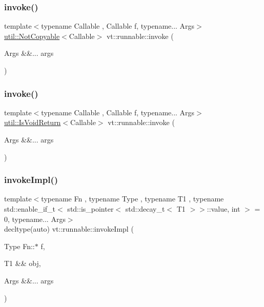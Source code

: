 \mbox{\label{namespacevt_1_1runnable_aa86b7892ea9590c2e8fef9ed0ca4e80c}} 
\subsubsection{\texorpdfstring{invoke()}{invoke()}\hspace{0.1cm}{\footnotesize\ttfamily [2/3]}}
{\footnotesize\ttfamily template$<$typename Callable , Callable f, typename... Args$>$ \\
\hyperlink{namespacevt_1_1util_a0760a3963341a602dfe2dfc42d78c867}{util\+::\+Not\+Copyable}$<$Callable$>$ vt\+::runnable\+::invoke (\begin{DoxyParamCaption}\item[{Args \&\&...}]{args }\end{DoxyParamCaption})}

\mbox{\label{namespacevt_1_1runnable_ad7a4c11af0d8864939dca87f89fba1cb}} 
\subsubsection{\texorpdfstring{invoke()}{invoke()}\hspace{0.1cm}{\footnotesize\ttfamily [3/3]}}
{\footnotesize\ttfamily template$<$typename Callable , Callable f, typename... Args$>$ \\
\hyperlink{namespacevt_1_1util_a97df3e28837417537b3bc035c74f064d}{util\+::\+Is\+Void\+Return}$<$Callable$>$ vt\+::runnable\+::invoke (\begin{DoxyParamCaption}\item[{Args \&\&...}]{args }\end{DoxyParamCaption})}

\mbox{\label{namespacevt_1_1runnable_a4253e4fa9c8c6e68da420ab440f2b298}} 
\subsubsection{\texorpdfstring{invoke\+Impl()}{invokeImpl()}\hspace{0.1cm}{\footnotesize\ttfamily [1/2]}}
{\footnotesize\ttfamily template$<$typename Fn , typename Type , typename T1 , typename std\+::enable\+\_\+if\+\_\+t$<$ std\+::is\+\_\+pointer$<$ std\+::decay\+\_\+t$<$ T1 $>$$>$\+::value, int $>$  = 0, typename... Args$>$ \\
decltype(auto) vt\+::runnable\+::invoke\+Impl (\begin{DoxyParamCaption}\item[{Type Fn\+::$\ast$}]{f,  }\item[{T1 \&\&}]{obj,  }\item[{Args \&\&...}]{args }\end{DoxyParamCaption})}

